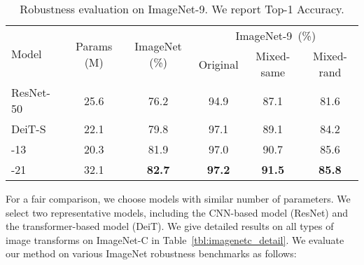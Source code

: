 \begin{table}[htbp!]
\centering
\caption{\footnotesize Robustness evaluation on ImageNet-9. We report Top-1 Accuracy.  
}
\label{tbl:imagenetnigh}
\begin{tabular}{l|c|c|ccc}
\toprule
\multirow{2}{*}{Model}                                  & \multirow{2}{*}{Params (M) } &  \multirow{2}{*}{ImageNet (\%)}    &  \multicolumn{3}{c}{ImageNet-9~\cite{xiao2020noise}(\%)}   \\
&     &   & Original & Mixed-same & Mixed-rand \\
\midrule
ResNet-50~\citep{he2016deep}           & 25.6   & 76.2         & 94.9    & 87.1       & 81.6     \\
DeiT-S~\citep{touvron2020training}     & 22.1   & 79.8         & 97.1     & 89.1       & 84.2     \\
\cvtname{}-13                          & 20.3   & 81.9         & 97.0    & 90.7       & 85.6      \\
\cvtname{}-21                          & 32.1   & \textbf{82.7} & \textbf{97.2}  & \textbf{91.5}       & \textbf{85.8}   \\
\bottomrule
\end{tabular}
\end{table}



For a fair comparison, we choose models with similar number of parameters. We select two representative models, including the  CNN-based model (ResNet) and the transformer-based model (DeiT).  
We give detailed results on all types of image transforms on ImageNet-C in Table~\ref{tbl:imagenetc_detail}.  We evaluate our method on various  ImageNet robustness benchmarks as follows:

